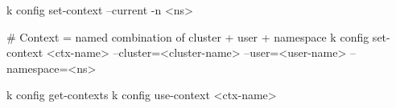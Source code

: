 \begin{cheatcodebashbold}
k config set-context --current -n <ns>
\end{cheatcodebashbold}

\begin{cheatcodebashbold}
# Context = named combination of cluster + user + namespace
k config set-context <ctx-name> --cluster=<cluster-name> --user=<user-name> --namespace=<ns>
\end{cheatcodebashbold}

\begin{cheatcodebash}
k config get-contexts
k config use-context <ctx-name>
\end{cheatcodebash}
